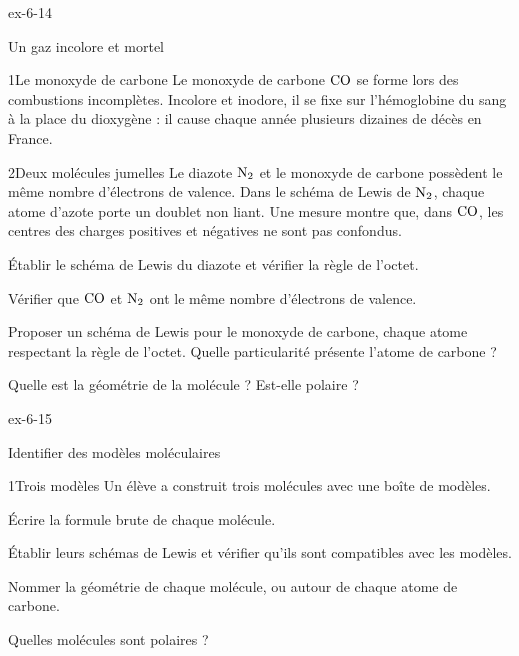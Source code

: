 \begin{blocLivre}{ex-6-14}
\begin{exercice}[3]{Un gaz incolore et mortel}
\begin{docu}{1}{Le monoxyde de carbone}
Le monoxyde de carbone $\ce{CO}$ se forme lors des combustions incomplètes. Incolore et inodore, il se fixe sur l'hémoglobine du
sang à la place du dioxygène : il cause chaque année plusieurs dizaines de décès en France.
\end{docu}
\begin{docu}{2}{Deux molécules jumelles}
Le diazote $\ce{N2}$ et le monoxyde de carbone possèdent le même nombre d'électrons de valence. Dans le schéma de Lewis de $\ce{N2}$,
chaque atome d'azote porte un doublet non liant.
Une mesure montre que, dans $\ce{CO}$, les centres des charges positives et négatives ne sont pas confondus.
\end{docu}
\begin{questions}
\item Établir le schéma de Lewis du diazote et vérifier la règle de l'octet.
\item Vérifier que $\ce{CO}$ et $\ce{N2}$ ont le même nombre d'électrons de valence.
\item \initiative Proposer un schéma de Lewis pour le monoxyde de carbone, chaque atome respectant la règle de l'octet. Quelle
particularité présente l'atome de carbone ?
\item Quelle est la géométrie de la molécule ? Est-elle polaire ?
\end{questions}
\end{exercice}
\end{blocLivre}
\begin{blocLivre}{ex-6-15}
\begin{exercice}[3]{Identifier des modèles moléculaires}
\begin{docu}{1}{Trois modèles}
Un élève a construit trois molécules avec une boîte de modèles.
\end{docu}
\begin{questions}
\item Écrire la formule brute de chaque molécule.
\item \initiative Établir leurs schémas de Lewis et vérifier qu'ils sont compatibles avec les modèles.
\item Nommer la géométrie de chaque molécule, ou autour de chaque atome de carbone.
\item Quelles molécules sont polaires ?
\end{questions}
\end{exercice}
\end{blocLivre}
